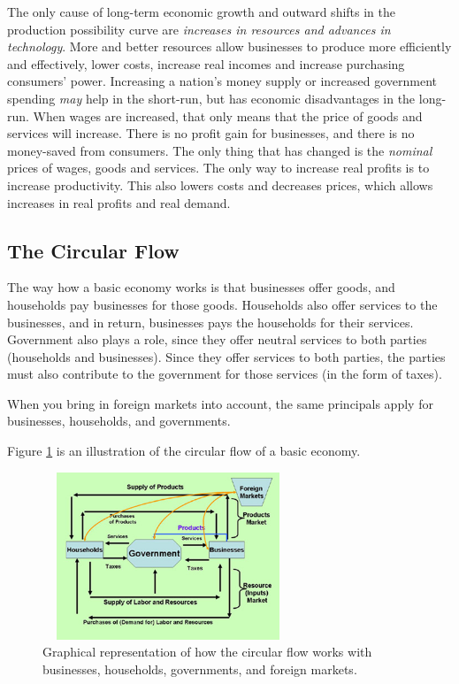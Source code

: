 \documentclass[a4paper, 12pt] {article}
\begin{document}
The only cause of long-term economic growth and outward shifts in the production
possibility curve  are \emph{increases in resources and advances in technology}.
More and better resources allow businesses to produce more efficiently and 
effectively, lower costs, increase real incomes and increase purchasing consumers'
power. Increasing a nation's money supply or increased government spending 
\emph{may} help in the short-run, but has economic disadvantages in the long-run.
When wages are increased, that only means that the price of goods and services will
increase. There is no profit gain for businesses, and there is no money-saved
from consumers. The only thing that has changed is the \emph{nominal} prices of
wages, goods and services. The only way to increase real profits is to increase
productivity. This also lowers costs and decreases prices, which allows increases
in real profits and real demand.

\subsection{The Circular Flow}
The way how a basic economy works is that businesses offer goods, and households
pay businesses for those goods. Households also offer services to the businesses,
and in return, businesses pays the households for their services. Government also
plays a role, since they offer neutral services to both parties (households and
businesses). Since they offer services to both parties, the parties must also 
contribute to the government for those services (in the form of taxes).

When you bring in foreign markets into account, the same principals apply for
businesses, households, and governments.

Figure \ref{ref:circular_flow} is an illustration of the circular flow of a 
basic economy.
\begin{figure}[h]
    \centering
    \includegraphics[width=7.5cm, height=5.0cm]{circular_flow.jpg}
    \caption{Graphical representation of how the circular flow works with 
    businesses, households, governments, and foreign markets.}
    \label{ref:circular_flow}
\end{figure}
\end{document}
